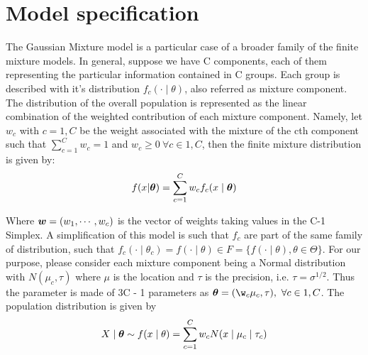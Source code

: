 \documentclass{article}
\begin{document}
\section{Model specification}
The Gaussian Mixture model is a particular case of a broader family of the finite mixture models. In general, suppose we have C components, each of them representing the particular information contained in C groups. Each group is described with it's distribution $f_c(\cdot \mid \theta)$, also referred as mixture component. The distribution of the overall population is represented as the linear combination of the weighted contribution of each mixture component. Namely, let $w_c$ with $c = {1, C}$ be the weight associated with the mixture of the cth component such that $\sum_{c = 1}^{C} w_c = 1$ and $w_c \geq 0  \ \forall c  \in {1,C}$, then the finite mixture distribution is given by:
\begin{equation}
f(x|\boldsymbol{\theta}) = \sum_{c = 1}^C w_c f_c(x \mid \boldsymbol{\theta})
\end{equation}

Where $\boldsymbol{w} = (w_1,\cdots , w_c)$ is the vector of weights taking values in the C-1 Simplex. A simplification of this model is such that $f_c$ are part of the same family of distribution, such that $f_c (\cdot \mid \theta_c) = f( \cdot \mid \theta) \in  F = \{f(\cdot \mid \theta), \theta \in \Theta \}$. For our purpose, please consider each mixture component being a Normal distribution with $N(\mu_c, \tau)$ where $\mu$ is the location and $\tau$ is the precision, i.e. $\tau = \sigma^{1/2}$. Thus the parameter is made of 3C - 1 parameters as  $\vect \theta = (\w_c \mu_c, \tau), \ \forall c \in {1,C}$. The population distribution is given by
\begin{equation}
X \mid \boldsymbol{\theta} \sim f(x \mid \theta)  = \sum_{c = 1}^C w_c N(x \mid \mu_c \mid \tau_c)
\end{equation}
\end{document}
